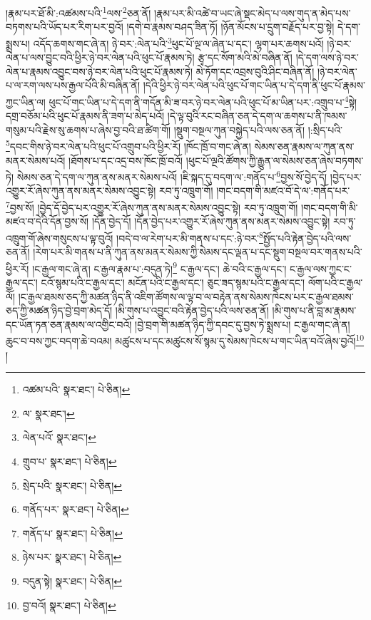 །རྣམ་པར་ཐོ་མི་:འཚམས་པའི་\footnote{འཚམ་པའི་  སྣར་ཐང་།  པེ་ཅིན། }ལས་\footnote{ལ་  སྣར་ཐང་། }ཅན་ནོ། །རྣམ་པར་མི་འཚེ་བ་ཡང་ཞེ་སྡང་མེད་པ་ལས་གུད་ན་མེད་པས་བཏགས་པའི་ཡོད་པར་རིག་པར་བྱའོ། །དགེ་བ་རྣམས་བཤད་ཟིན་ཏོ། །ཉོན་མོངས་པ་དྲུག་བརྗོད་པར་བྱ་སྟེ། དེ་དག་སྨྲས་པ། འདོད་ཆགས་གང་ཞེ་ན། ཉེ་བར་:ལེན་པའི་\footnote{ལེན་པའོ་  སྣར་ཐང་། }ཕུང་པོ་ལྔ་ལ་ཞེན་པ་དང་། ལྷག་པར་ཆགས་པའོ། །ཉེ་བར་ལེན་པ་ལས་བྱུང་བའི་ཕྱིར་ཉེ་བར་ལེན་པའི་ཕུང་པོ་རྣམས་ཏེ། རྩྭ་དང་སོག་མའི་མེ་བཞིན་ནོ། །དེ་དག་ལས་ཉེ་བར་ལེན་པ་རྣམས་འབྱུང་བས་ཉེ་བར་ལེན་པའི་ཕུང་པོ་རྣམས་ཏེ། མེ་ཏོག་དང་འབྲས་བུའི་ཤིང་བཞིན་ནོ། །ཉེ་བར་ལེན་པ་ལ་རག་ལས་པས་རྒྱལ་པོའི་མི་བཞིན་ནོ། །དེའི་ཕྱིར་ཉེ་བར་ལེན་པའི་ཕུང་པོ་གང་ཡིན་པ་དེ་དག་ནི་ཕུང་པོ་རྣམས་ཀྱང་ཡིན་ལ། ཕུང་པོ་གང་ཡིན་པ་དེ་དག་ནི་གདོན་མི་ཟ་བར་ཉེ་བར་ལེན་པའི་ཕུང་པོ་མ་ཡིན་པར་:འགྲུབ་པ་\footnote{གྲུབ་པ་  སྣར་ཐང་།  པེ་ཅིན། }སྟེ། དགྲ་བཅོམ་པའི་ཕུང་པོ་རྣམས་ནི་ཟག་པ་མེད་པའོ། །དེ་ལྟ་བུའི་རང་བཞིན་ཅན་དེ་དག་ལ་ཆགས་པ་ནི་ཁམས་གསུམ་པའི་རྗེས་སུ་ཆགས་པ་ཞེས་བྱ་བའི་ཐ་ཚིག་གོ། །སྡུག་བསྔལ་ཀུན་བསྐྱེད་པའི་ལས་ཅན་ནོ། །:སྲིད་པའི་\footnote{སྲེད་པའི་  སྣར་ཐང་།  པེ་ཅིན། }དབང་གིས་ཉེ་བར་ལེན་པའི་ཕུང་པོ་འགྲུབ་པའི་ཕྱིར་རོ། །ཁོང་ཁྲོ་བ་གང་ཞེ་ན། སེམས་ཅན་རྣམས་ལ་ཀུན་ནས་མནར་སེམས་པའོ། །ཐོགས་པ་དང་འདྲ་བས་ཁོང་ཁྲོ་བའོ། །ཕུང་པོ་ལྔའི་ཚོགས་ཀྱི་རྒྱུན་ལ་སེམས་ཅན་ཞེས་བཏགས་ཏེ། སེམས་ཅན་དེ་དག་ལ་ཀུན་ནས་མནར་སེམས་པའོ། །ཇི་སྐད་དུ་བདག་ལ་:གནོད་པ་\footnote{གནོད་པར་  སྣར་ཐང་།  པེ་ཅིན། }བྱས་སོ་བྱེད་དོ། །བྱེད་པར་འགྱུར་རོ་ཞེས་ཀུན་ནས་མནར་སེམས་འབྱུང་སྟེ། རབ་ཏུ་འཁྲུག་གོ། །གང་བདག་གི་མཛའ་བོ་དེ་ལ་:གནོད་པར་\footnote{གནོད་པ་  སྣར་ཐང་།  པེ་ཅིན། }བྱས་སོ། །བྱེད་དོ་བྱེད་པར་འགྱུར་རོ་ཞེས་ཀུན་ནས་མནར་སེམས་འབྱུང་སྟེ། རབ་ཏུ་འཁྲུག་གོ། །གང་བདག་གི་མི་མཛའ་བ་དེའི་དོན་བྱས་སོ། །དོན་བྱེད་དོ། །དོན་བྱེད་པར་འགྱུར་རོ་ཞེས་ཀུན་ནས་མནར་སེམས་འབྱུང་སྟེ། རབ་ཏུ་འཁྲུག་གོ་ཞེས་གསུངས་པ་ལྟ་བུའོ། །བདེ་བ་ལ་རེག་པར་མི་གནས་པ་དང་:ཉེ་བར་\footnote{ཉེས་པར་  སྣར་ཐང་།  པེ་ཅིན། }སྤྱོད་པའི་རྟེན་བྱེད་པའི་ལས་ཅན་ནོ། །རེག་པར་མི་གནས་པ་ནི་ཀུན་ནས་མནར་སེམས་ཀྱི་སེམས་དང་ལྡན་པ་དང་སྡུག་བསྔལ་བར་གནས་པའི་ཕྱིར་རོ། །ང་རྒྱལ་གང་ཞེ་ན། ང་རྒྱལ་རྣམ་པ་:བདུན་ཏེ།\footnote{བདུན་སྟེ།  སྣར་ཐང་།  པེ་ཅིན། } ང་རྒྱལ་དང་། ཆེ་བའི་ང་རྒྱལ་དང་། ང་རྒྱལ་ལས་ཀྱང་ང་རྒྱལ་དང་། ངའོ་སྙམ་པའི་ང་རྒྱལ་དང་། མངོན་པའི་ང་རྒྱལ་དང་། ཅུང་ཟད་སྙམ་པའི་ང་རྒྱལ་དང་། ལོག་པའི་ང་རྒྱལ་ལོ། །ང་རྒྱལ་ཐམས་ཅད་ཀྱི་མཚན་ཉིད་ནི་འཇིག་ཚོགས་ལ་ལྟ་བ་ལ་བརྟེན་ནས་སེམས་ཁེངས་པར་ང་རྒྱལ་ཐམས་ཅད་ཀྱི་མཚན་ཉིད་བྱེ་བྲག་མེད་དོ། །མི་གུས་པ་འབྱུང་བའི་རྟེན་བྱེད་པའི་ལས་ཅན་ནོ། །མི་གུས་པ་ནི་བླ་མ་རྣམས་དང་ཡོན་ཏན་ཅན་རྣམས་ལ་འགྱིང་བའོ། །བྱེ་བྲག་གི་མཚན་ཉིད་ཀྱི་དབང་དུ་བྱས་ཏེ་སྨྲས་པ། ང་རྒྱལ་གང་ཞེ་ན། ཆུང་བ་བས་ཀྱང་བདག་ཆེ་བའམ། མཚུངས་པ་དང་མཚུངས་སོ་སྙམ་དུ་སེམས་ཁེངས་པ་གང་ཡིན་བའོ་ཞེས་བྱའོ།\footnote{བྱ་བའོ།  སྣར་ཐང་།  པེ་ཅིན། } །
